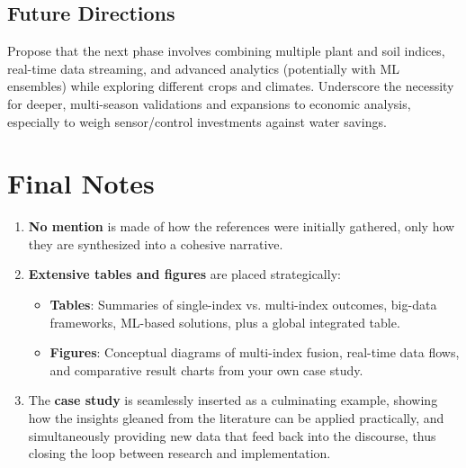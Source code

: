 \documentclass[12pt]{article}
\begin{document}
\subsection{Future Directions}
Propose that the next phase involves combining multiple plant and soil indices, real-time data streaming, and advanced analytics (potentially with ML ensembles) while exploring different crops and climates. Underscore the necessity for deeper, multi-season validations and expansions to economic analysis, especially to weigh sensor/control investments against water savings.



\section*{Final Notes}
\begin{enumerate}
\item \textbf{No mention} is made of how the references were initially gathered, only how they are synthesized into a cohesive narrative.
\item \textbf{Extensive tables and figures} are placed strategically:
   \begin{itemize}
   \item \textbf{Tables}: Summaries of single-index vs. multi-index outcomes, big-data frameworks, ML-based solutions, plus a global integrated table.
   \item \textbf{Figures}: Conceptual diagrams of multi-index fusion, real-time data flows, and comparative result charts from your own case study.
   \end{itemize}
\item The \textbf{case study} is seamlessly inserted as a culminating example, showing how the insights gleaned from the literature can be applied practically, and simultaneously providing new data that feed back into the discourse, thus closing the loop between research and implementation.
\end{enumerate}

\clearpage
\printbibliography[heading=bibintoc, title={References}]
\clearpage
\appendix

\end{document}
